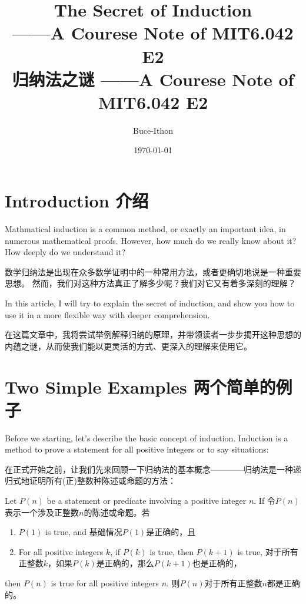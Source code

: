 \documentclass{Math_Note}
\title{The Secret of Induction \\ \small ------A Courese Note of MIT6.042 E2 \\ 归纳法之谜 \small ------A Courese Note of MIT6.042 E2}
\author{Buce-Ithon}
\date{\today}
\begin{document}
\maketitle

\newpage
\tableofcontents
\newpage

\section{Introduction 介绍}
Mathmatical induction is a common method, or exactly an important idea, in numerous mathematical proofs. However, how much do we really know about it?
How deeply do we understand it? 

数学归纳法是出现在众多数学证明中的一种常用方法，或者更确切地说是一种重要思想。 然而，我们对这种方法真正了解多少呢？我们对它又有着多深刻的理解？

In this article, I will try to explain the secret of induction, and show you how to use it in a more flexible way with 
deeper comprehension.

在这篇文章中，我将尝试举例解释归纳的原理，并带领读者一步步揭开这种思想的内蕴之谜，从而使我们能以更灵活的方式、更深入的理解来使用它。

\section{Two Simple Examples 两个简单的例子}
Before we starting, let's describe the basic concept of induction. Induction is a method to prove a statement for all positive integers or to say situations: 

在正式开始之前，让我们先来回顾一下归纳法的基本概念————归纳法是一种递归式地证明所有(正)整数种陈述或命题的方法：

\begin{mdframed}
\begin{thm}
    Let $P(n)$ be a statement or predicate involving a positive integer $n$. If 令$P(n)$表示一个涉及正整数$n$的陈述或命题。若
    \begin{enumerate}
        \item $P(1)$ is true, and 基础情况$P(1)$是正确的，且
        \item For all positive integers $k$, if $P(k)$ is true, then $P(k+1)$ is true, 对于所有正整数$k$，如果$P(k)$是正确的，那么$P(k+1)$也是正确的，
    \end{enumerate}
    then $P(n)$ is true for all positive integers $n$. 则$P(n)$对于所有正整数$n$都是正确的。
\end{thm}
\end{mdframed}
\end{document}
